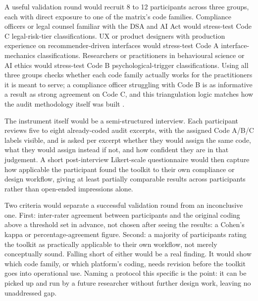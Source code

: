 \documentclass[11pt]{article}
\begin{document}
A useful validation round would recruit 8 to 12 participants across three groups, each with direct exposure to one of the matrix's code families. Compliance officers or legal counsel familiar with the DSA and AI Act would stress-test Code C legal-risk-tier classifications. UX or product designers with production experience on recommender-driven interfaces would stress-test Code A interface-mechanics classifications. Researchers or practitioners in behavioural science or AI ethics would stress-test Code B psychological-trigger classifications. Using all three groups checks whether each code family actually works for the practitioners it is meant to serve; a compliance officer struggling with Code B is as informative a result as strong agreement on Code C, and this triangulation logic matches how the audit methodology itself was built \parencites[16]{8200246}[19]{3195574}.

The instrument itself would be a semi-structured interview. Each participant reviews five to eight already-coded audit excerpts, with the assigned Code A/B/C labels visible, and is asked per excerpt whether they would assign the same code, what they would assign instead if not, and how confident they are in that judgement. A short post-interview Likert-scale questionnaire would then capture how applicable the participant found the toolkit to their own compliance or design workflow, giving at least partially comparable results across participants rather than open-ended impressions alone.

Two criteria would separate a successful validation round from an inconclusive one. First: inter-rater agreement between participants and the original coding above a threshold set in advance, not chosen after seeing the results: a Cohen's kappa or percentage-agreement figure. Second: a majority of participants rating the toolkit as practically applicable to their own workflow, not merely conceptually sound. Falling short of either would be a real finding. It would show which code family, or which platform's coding, needs revision before the toolkit goes into operational use. Naming a protocol this specific is the point: it can be picked up and run by a future researcher without further design work, leaving no unaddressed gap.
\end{document}
